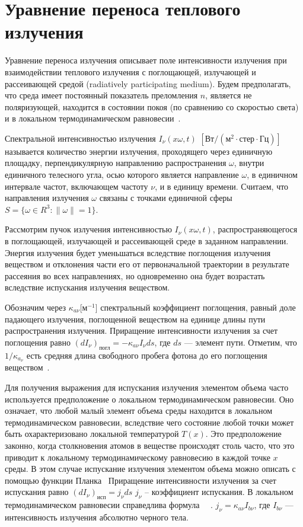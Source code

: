 \section{Уравнение переноса теплового излучения}\label{sec:ch1/sec1}
Уравнение переноса излучения описывает поле интенсивности излучения
при взаимодействии теплового излучения с поглощающей,
излучающей и рассеивающей средой
(radiatively participating medium).
Будем предполагать, что среда имеет постоянный показатель
преломления $n$, является не поляризующей,
находится в состоянии покоя (по сравнению со скоростью света) и в локальном
термодинамическом равновесии~\cite[280]{modest2013radiative}.


Спектральной интенсивностью излучения $I_\nu (x \omega, t)$ $[\text{Вт}/(м^2 \cdot \text{стер} \cdot \text{Гц})]$
называется количество энергии излучения, проходящего через единичную
площадку, перпендикулярную направлению распространения $\omega$, внутри единичного телесного угла,
осью которого является направление $\omega$, в единичном
интервале частот, включающем частоту $\nu$, и в единицу времени.
Считаем, что направления излучения $\omega$ связаны с точками единичной
сферы $S = \{\omega \in R^3: \| \omega\| = 1\}$.


Рассмотрим пучок излучения интенсивностью $I_\nu (x \omega, t)$, распространяющегося в поглощающей,
излучающей и рассеивающей среде в заданном направлении.
Энергия излучения будет уменьшаться вследствие поглощения
излучения веществом и отклонения части его от первоначальной траектории в
результате рассеяния во всех направлениях, но одновременно она будет возрастать
вследствие испускания излучения веществом.


Обозначим через $\kappa_{a\nu}$[$\text{м}^{-1}$] спектральный коэффициент поглощения,
равный доле падающего излучения, поглощенной веществом на единице длины
пути распространения излучения.
Приращение интенсивности излучения за счет поглощения равно
$(dI_\nu)_\text{погл} = -\kappa_{a\nu} I_\nu ds$, где $ds$ — элемент пути.
Отметим, что $1/\kappa_{a_\nu}$ есть средняя длина свободного пробега фотона до его поглощения
веществом~\cite[281]{modest2013radiative}.


Для получения выражения для испускания излучения элементом объема
часто используется предположение о локальном термодинамическом равновесии.
Оно означает, что любой малый элемент объема среды находится в
локальном термодинамическом равновесии, вследствие чего состояние любой
точки может быть охарактеризовано локальной температурой $T(x)$.
Это предположение законно, когда столкновения атомов в веществе происходят столь
часто, что это приводит к локальному термодинамическому равновесию в каждой точке $x$ среды.
В этом случае испускание излучения элементом объема
можно описать с помощью функции Планка~\cite[36]{Ozisik1976}
Приращение интенсивности излучения за счет испускания равно
$(dI_\nu)_\text{исп}  = j_\nu ds$  $j_\nu$ -- коэффициент испускания.
В локальном термодинамическом равновесии справедлива формула~\cite[36]{Ozisik1976}
~\cite[282]{modest2013radiative}. $j_\nu = \kappa_{a\nu} I_{b\nu}$, где
$I_{b\nu}$ — интенсивность излучения абсолютно черного тела.


